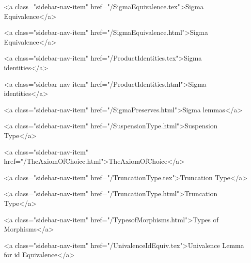       
    
      
        
          <a class="sidebar-nav-item" href="/SigmaEquivalence.tex">Sigma Equivalence</a>
        
      
    
      
        
          <a class="sidebar-nav-item" href="/SigmaEquivalence.html">Sigma Equivalence</a>
        
      
    
      
        
          <a class="sidebar-nav-item" href="/ProductIdentities.tex">Sigma identities</a>
        
      
    
      
        
          <a class="sidebar-nav-item" href="/ProductIdentities.html">Sigma identities</a>
        
      
    
      
        
          <a class="sidebar-nav-item" href="/SigmaPreserves.html">Sigma lemmas</a>
        
      
    
      
        
          <a class="sidebar-nav-item" href="/SuspensionType.html">Suspension Type</a>
        
      
    
      
        
          <a class="sidebar-nav-item" href="/TheAxiomOfChoice.html">TheAxiomOfChoice</a>
        
      
    
      
        
          <a class="sidebar-nav-item" href="/TruncationType.tex">Truncation Type</a>
        
      
    
      
        
          <a class="sidebar-nav-item" href="/TruncationType.html">Truncation Type</a>
        
      
    
      
        
          <a class="sidebar-nav-item" href="/TypesofMorphisms.html">Types of Morphisms</a>
        
      
    
      
        
          <a class="sidebar-nav-item" href="/UnivalenceIdEquiv.tex">Univalence Lemma for id Equivalence</a>
        

